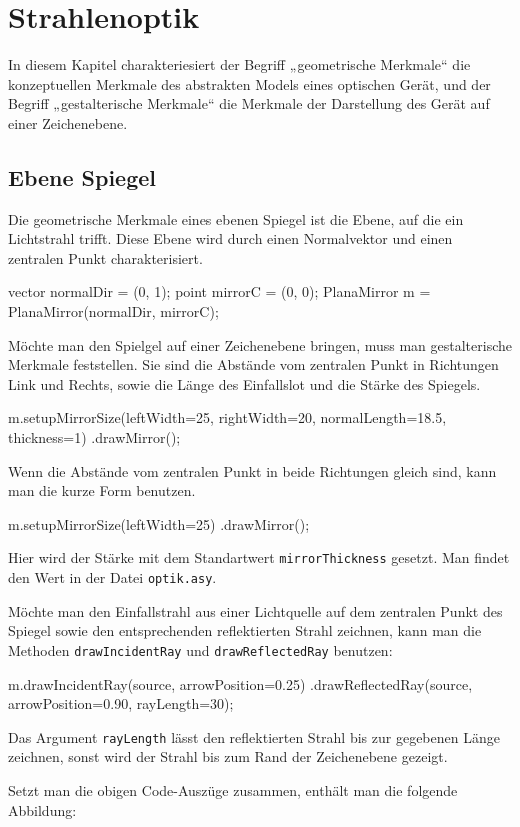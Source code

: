 \chapter{Strahlenoptik}

In diesem Kapitel charakteriesiert der Begriff „geometrische Merkmale“ die konzeptuellen Merkmale des abstrakten Models eines optischen Gerät,
und der Begriff „gestalterische Merkmale“ die Merkmale der Darstellung des Gerät auf einer Zeichenebene.

\section{Ebene Spiegel}

Die geometrische Merkmale eines ebenen Spiegel ist die Ebene, auf die ein Lichtstrahl trifft.
Diese Ebene wird durch einen Normalvektor und einen zentralen Punkt charakterisiert.

\begin{asycode}
vector normalDir = (0, 1);
point mirrorC = (0, 0);
PlanaMirror m = PlanaMirror(normalDir, mirrorC);
\end{asycode}

Möchte man den Spielgel auf einer Zeichenebene bringen, muss man gestalterische Merkmale feststellen.
Sie sind die Abstände vom zentralen Punkt in Richtungen Link und Rechts, sowie die Länge des Einfallslot und die Stärke des Spiegels.

\begin{asycode}
m.setupMirrorSize(leftWidth=25, rightWidth=20, normalLength=18.5, thickness=1)
 .drawMirror();
\end{asycode}

Wenn die Abstände vom zentralen Punkt in beide Richtungen gleich sind, kann man die kurze Form benutzen.

\begin{asycode}
m.setupMirrorSize(leftWidth=25)
 .drawMirror();
\end{asycode}

Hier wird der Stärke mit dem Standartwert \texttt{mirrorThickness} gesetzt.
Man findet den Wert in der Datei \texttt{optik.asy}.

Möchte man den Einfallstrahl aus einer Lichtquelle auf dem zentralen Punkt des Spiegel sowie den entsprechenden reflektierten Strahl zeichnen,
kann man die Methoden \texttt{drawIncidentRay} und \texttt{drawReflectedRay} benutzen:

\begin{asycode}
m.drawIncidentRay(source, arrowPosition=0.25)
 .drawReflectedRay(source, arrowPosition=0.90, rayLength=30); 
\end{asycode}

Das Argument \texttt{rayLength} lässt den reflektierten Strahl bis zur gegebenen Länge zeichnen, 
sonst wird der Strahl bis zum Rand der Zeichenebene gezeigt.

Setzt man die obigen Code-Auszüge zusammen, enthält man die folgende Abbildung:




